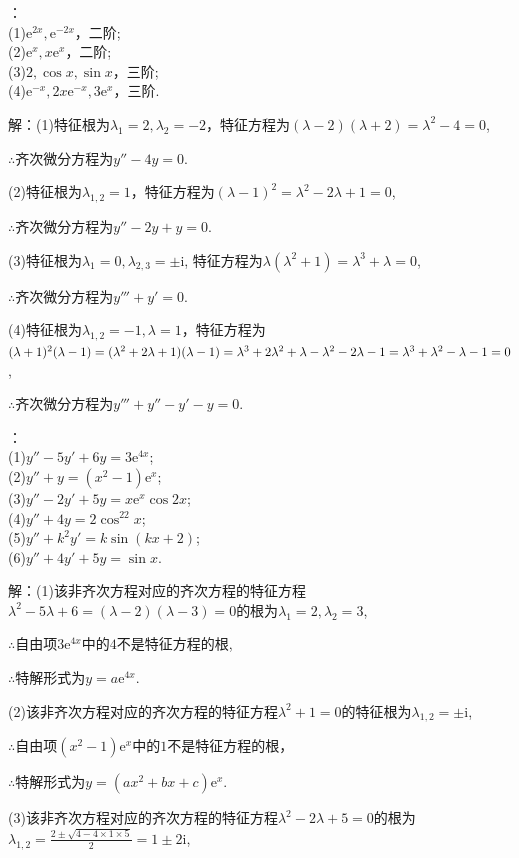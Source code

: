 \documentclass[12pt,UTF8]{ctexart}
\newcommand{\me}[0]{\mathrm e}
\newcommand{\m}[0]{\mathrm }
\begin{document}
\begin{enumerate}
：\\
(1)$\me^{2x},\me^{-2x}$，二阶;\\
(2)$\me^x,x\me^x$，二阶;\\
(3)$2,\cos x,\sin  x$，三阶;\\
(4)$\me^{-x},2x\me^{-x},3\me^x$，三阶.

解：(1)特征根为$\lambda_1=2,\lambda_2=-2$，特征方程为$(\lambda-2)(\lambda+2)=\lambda^2-4=0$,

$\therefore$齐次微分方程为$y''-4y=0$.

(2)特征根为$\lambda_{1,2}=1$，特征方程为$(\lambda-1)^2=\lambda^2-2\lambda+1=0$,

$\therefore$齐次微分方程为$y''-2y+y=0$.

(3)特征根为$\lambda_1=0,\lambda_{2,3}=\pm\m i$, 特征方程为$\lambda(\lambda^2+1)=\lambda^3+\lambda=0$,

$\therefore$齐次微分方程为$y'''+y'=0$.

(4)特征根为$\lambda_{1,2}=-1,\lambda=1$，特征方程为$(\lambda+1)^2(\lambda-1)=(\lambda^2+2\lambda+1)(\lambda-1)\\
=\lambda^3+2\lambda^2+\lambda-\lambda^2-2\lambda-1=\lambda^3+\lambda^2-\lambda-1=0$,

$\therefore$齐次微分方程为$y'''+y''-y'-y=0$.

：\\
(1)$y''-5y'+6y=3\me^{4x}$;\\
(2)$y''+y=(x^2-1)\me^x$;\\
(3)$y''-2y'+5y=x\me^x\cos2x$;\\
(4)$y''+4y=2\cos^22x$;\\
(5)$y''+k^2y'=k\sin(kx+2)$;\\
(6)$y''+4y'+5y=\sin x$.

解：(1)该非齐次方程对应的齐次方程的特征方程$\lambda^2-5\lambda+6=(\lambda-2)(\lambda-3)=0$的根为$\lambda_1=2,\lambda_2=3$,

$\therefore$自由项$3\me^{4x}$中的$4$不是特征方程的根,

$\therefore$特解形式为$y=a\me^{4x}$.

(2)该非齐次方程对应的齐次方程的特征方程$\lambda^2+1=0$的特征根为$\lambda_{1,2}=\pm\m i$,

$\therefore$自由项$(x^2-1)\me^x$中的$1$不是特征方程的根，

$\therefore$特解形式为$y=(ax^2+bx+c)\me^x$.

(3)该非齐次方程对应的齐次方程的特征方程$\lambda^2-2\lambda+5=0$的根为$\lambda_{1,2}=\frac{2\pm\sqrt{4-4\times1\times5}}2=1\pm2\m i$,


\end{enumerate}
\end{document}
